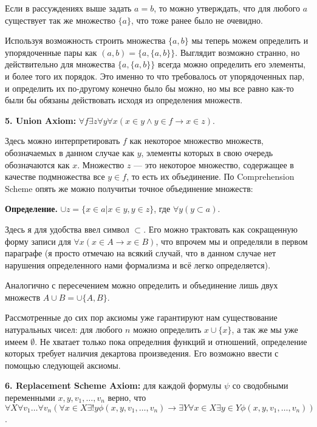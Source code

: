 Если в рассуждениях выше задать $a = b$, то можно утверждать, что для любого $a$ существует так же множество $\{a\}$, что тоже ранее было не очевидно.

Используя возможность строить множества $\{a, b\}$ мы теперь можем определить и упорядоченные пары как $(a, b) = \{a, \{a, b\}\}$. Выглядит возможно странно, но действительно для множества $\{a, \{a, b\}\}$ всегда можно определить его элементы, и более того их порядок. Это именно то что требовалось от упорядоченных пар, и определить их по-другому конечно было бы можно, но мы все равно как-то были бы обязаны действовать исходя из определения множеств.

{\bfseries 5. Union Axiom:} $\forall f \exists z \forall y \forall x (x \in y \wedge y \in f \rightarrow x \in z)$.

Здесь можно интерпретировать $f$ как некоторое множество множеств, обозначаемых в данном случае как $y$, элементы которых в свою очередь обозначаются как $x$. Множество $z$ — это некоторое множество, содержащее в качестве подмножества все $y \in f$, то есть их объединение. По Comprehension Scheme опять же можно получитьи точное объединение множеств:

{\bfseries Определение.} $\cup z = \{x \in a|x\in y, y\in z\}$, где $\forall y (y \subset a)$.

Здесь я для удобства ввел символ $\subset$. Его можно трактовать как сокращенную форму записи для $\forall x (x\in A \rightarrow x \in B)$, что впрочем мы и определяли в первом параграфе (я просто отмечаю на всякий случай, что в данном случае нет нарушения определенного нами формализма и всё легко определяется).

Аналогично с пересечением можно определить и объединение лишь двух множеств $A\cup B = \cup \{A, B\}$.

Рассмотренные до сих пор аксиомы уже гарантируют нам существование натуральных чисел: для любого $n$ можно определить $x\cup\{x\}$, а так же мы уже имеем $\emptyset$. Не хватает только пока определния функций и отношений, определение которых требует наличия декартова произведения. Его возможно ввести с помощью следующей аксиомы.

{\bfseries 6. Replacement Scheme Axiom:} для каждой формулы $\psi$ со сводобными переменными $x, y, v_1, \ldots, v_n$ верно, что $\forall X \forall v_1 \ldots \forall v_n (\forall x\in X \exists ! y \phi(x, y, v_1, \ldots, v_n) \rightarrow \exists Y \forall x \in X \exists y \in Y \phi(x, y, v_1, \ldots, v_n))$.

